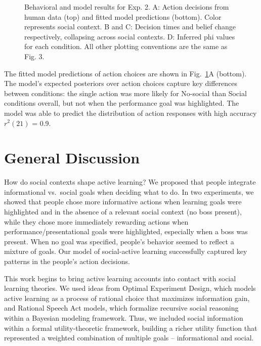 \documentclass[10pt, letterpaper]{article}
\newenvironment{CodeChunk}{}{}
\begin{document}
\begin{CodeChunk}
\begin{figure}[H]
{}

\caption[Behavioral and model results for Exp]{Behavioral and model results for Exp. 2. A: Action decisions from human data (top) and fitted model predictions (bottom). Color represents social context. B and C: Decision times and belief change respectively, collapsing across social contexts. D: Inferred phi values for each condition. All other plotting conventions are the same as Fig. 3.}\label{fig:e2_results}
\end{figure}
\end{CodeChunk}

The fitted model predictions of action choices are shown in
Fig.~\ref{fig:e2_results}A (bottom). The model's expected posteriors
over action choices capture key differences between conditions: the
single action was more likely for No-social than Social conditions
overall, but not when the performance goal was highlighted. The model
was able to predict the distribution of action responses with high
accuracy \(r^2(21)\) = 0.9.

\section{General Discussion}\label{general-discussion}

How do social contexts shape active learning? We proposed that people
integrate informational vs.~social goals when deciding what to do. In
two experiments, we showed that people chose more informative actions
when learning goals were highlighted and in the absence of a relevant
social context (no boss present), while they chose more immediately
rewarding actions when performance/presentational goals were
highlighted, especially when a boss was present. When no goal was
specified, people's behavior seemed to reflect a mixture of goals. Our
model of social-active learning successfully captured key patterns in
the people's action decisions.

This work begins to bring active learning accounts into contact with
social learning theories. We used ideas from Optimal Experiment Design,
which models active learning as a process of rational choice that
maximizes information gain, and Rational Speech Act models, which
formalize recursive social reasoning within a Bayesian modeling
framework. Thus, we included social information within a formal
utility-theoretic framework, building a richer utility function that
represented a weighted combination of multiple goals -- informational
and social.
\end{document}
